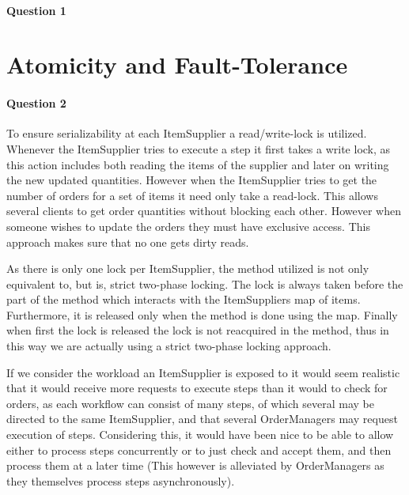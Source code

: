 \documentclass[a4paper, 11pt]{article}
\begin{document}
\paragraph{Question 1} %
\label{par:question_1}



\section{Atomicity and Fault-Tolerance} %
\label{sec:atomicity_and_fault_tolerance}

\paragraph{Question 2} %
\label{par:question_2}

To ensure serializability at each ItemSupplier a read/write-lock is utilized. Whenever the ItemSupplier tries to execute a step it first takes a write lock, as this action includes both reading the items of the supplier and later on writing the new updated quantities. However when the ItemSupplier tries to get the number of orders for a set of items it need only take a read-lock. This allows several clients to get order quantities without blocking each other. However when someone wishes to update the orders they must have exclusive access. This approach makes sure that no one gets dirty reads.

As there is only one lock per ItemSupplier, the method utilized is not only equivalent to, but is, strict two-phase locking. The lock is always taken before the part of the method which interacts with the ItemSuppliers map of items. Furthermore, it is released only when the method is done using the map. Finally when first the lock is released the lock is not reacquired in the method, thus in this way we are actually using a strict two-phase locking approach.

If we consider the workload an ItemSupplier is exposed to it would seem realistic that it would receive more requests to execute steps than it would to check for orders, as each workflow can consist of many steps, of which several may be directed to the same ItemSupplier, and that several OrderManagers may request execution of steps. Considering this, it would have been nice to be able to allow either to process steps concurrently or to just check and accept them, and then process them at a later time (This however is alleviated by OrderManagers as they themselves process steps asynchronously). 
\end{document}
